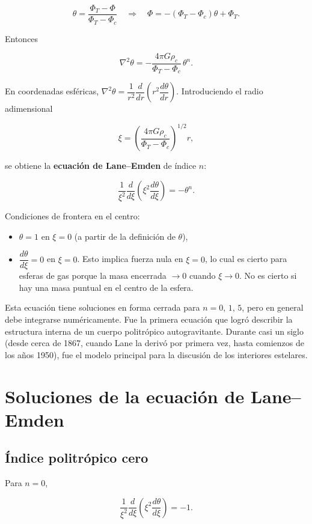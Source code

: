$$ \theta = \frac{\Phi_T - \Phi}{\Phi_T - \Phi_c} \quad\Rightarrow\quad \Phi = -(\Phi_T - \Phi_c)\theta + \Phi_T. $$

Entonces

$$ \nabla^2\theta = -\frac{4\pi G\rho_c}{\Phi_T - \Phi_c}\,\theta^n. $$

En coordenadas esféricas, $\nabla^2\theta = \dfrac{1}{r^2}\dfrac{d}{dr}\left(r^2\dfrac{d\theta}{dr}\right)$. Introduciendo el radio adimensional

$$ \xi = \left(\frac{4\pi G\rho_c}{\Phi_T - \Phi_c}\right)^{1/2} r, $$

se obtiene la \textbf{ecuación de Lane--Emden} de índice $n$:

$$ \frac{1}{\xi^2}\frac{d}{d\xi}\left(\xi^2\frac{d\theta}{d\xi}\right) = -\theta^n. $$

Condiciones de frontera en el centro:

\begin{itemize}
\item $\theta = 1$ en $\xi = 0$ (a partir de la definición de $\theta$),
\item $\dfrac{d\theta}{d\xi} = 0$ en $\xi = 0$. Esto implica fuerza nula en $\xi = 0$, lo cual es cierto para esferas de gas porque la masa encerrada $\to 0$ cuando $\xi \to 0$. No es cierto si hay una masa puntual en el centro de la esfera.
\end{itemize}

Esta ecuación tiene soluciones en forma cerrada para $n = 0,\,1,\,5$, pero en general debe integrarse numéricamente. Fue la primera ecuación que logró describir la estructura interna de un cuerpo politrópico autogravitante. Durante casi un siglo (desde cerca de 1867, cuando Lane la derivó por primera vez, hasta comienzos de los años 1950), fue el modelo principal para la discusión de los interiores estelares.

\section{Soluciones de la ecuación de Lane--Emden}

\figuraSolucionesLaneEmden

\subsection{Índice politrópico cero}

Para $n = 0$,

$$ \frac{1}{\xi^2}\frac{d}{d\xi}\left(\xi^2\frac{d\theta}{d\xi}\right) = -1. $$

